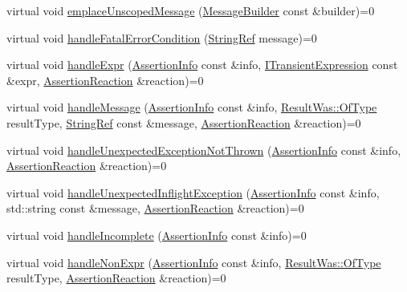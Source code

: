 \begin{DoxyCompactItemize}
\item 
virtual void \mbox{\hyperlink{struct_catch_1_1_i_result_capture_a49f74f1323ef8be71b8f9b8e8b2c0fc2}{emplace\+Unscoped\+Message}} (\mbox{\hyperlink{struct_catch_1_1_message_builder}{Message\+Builder}} const \&builder)=0
\item 
virtual void \mbox{\hyperlink{struct_catch_1_1_i_result_capture_a48559e6598ba9474b903697b69c769b2}{handle\+Fatal\+Error\+Condition}} (\mbox{\hyperlink{class_catch_1_1_string_ref}{String\+Ref}} message)=0
\item 
virtual void \mbox{\hyperlink{struct_catch_1_1_i_result_capture_a59a2b05391e464954575d2afb6d5d607}{handle\+Expr}} (\mbox{\hyperlink{struct_catch_1_1_assertion_info}{Assertion\+Info}} const \&info, \mbox{\hyperlink{struct_catch_1_1_i_transient_expression}{I\+Transient\+Expression}} const \&expr, \mbox{\hyperlink{struct_catch_1_1_assertion_reaction}{Assertion\+Reaction}} \&reaction)=0
\item 
virtual void \mbox{\hyperlink{struct_catch_1_1_i_result_capture_a21788ebc64571abf322b80c8cc51794d}{handle\+Message}} (\mbox{\hyperlink{struct_catch_1_1_assertion_info}{Assertion\+Info}} const \&info, \mbox{\hyperlink{struct_catch_1_1_result_was_a624e1ee3661fcf6094ceef1f654601ef}{Result\+Was\+::\+Of\+Type}} result\+Type, \mbox{\hyperlink{class_catch_1_1_string_ref}{String\+Ref}} const \&message, \mbox{\hyperlink{struct_catch_1_1_assertion_reaction}{Assertion\+Reaction}} \&reaction)=0
\item 
virtual void \mbox{\hyperlink{struct_catch_1_1_i_result_capture_a6382ed20486e2d9a020da971c6d5c53d}{handle\+Unexpected\+Exception\+Not\+Thrown}} (\mbox{\hyperlink{struct_catch_1_1_assertion_info}{Assertion\+Info}} const \&info, \mbox{\hyperlink{struct_catch_1_1_assertion_reaction}{Assertion\+Reaction}} \&reaction)=0
\item 
virtual void \mbox{\hyperlink{struct_catch_1_1_i_result_capture_afc97bc69829185222f955ebeef97adfe}{handle\+Unexpected\+Inflight\+Exception}} (\mbox{\hyperlink{struct_catch_1_1_assertion_info}{Assertion\+Info}} const \&info, std\+::string const \&message, \mbox{\hyperlink{struct_catch_1_1_assertion_reaction}{Assertion\+Reaction}} \&reaction)=0
\item 
virtual void \mbox{\hyperlink{struct_catch_1_1_i_result_capture_a89b89372eb09cc44f8dcad363de6157d}{handle\+Incomplete}} (\mbox{\hyperlink{struct_catch_1_1_assertion_info}{Assertion\+Info}} const \&info)=0
\item 
virtual void \mbox{\hyperlink{struct_catch_1_1_i_result_capture_ab7dbdf8aa28427119583e24dbb302c63}{handle\+Non\+Expr}} (\mbox{\hyperlink{struct_catch_1_1_assertion_info}{Assertion\+Info}} const \&info, \mbox{\hyperlink{struct_catch_1_1_result_was_a624e1ee3661fcf6094ceef1f654601ef}{Result\+Was\+::\+Of\+Type}} result\+Type, \mbox{\hyperlink{struct_catch_1_1_assertion_reaction}{Assertion\+Reaction}} \&reaction)=0

\end{DoxyCompactItemize}

